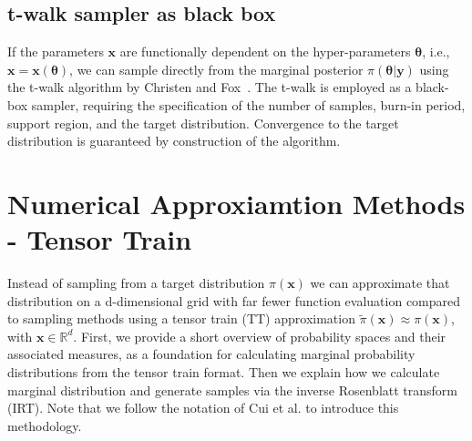 \subsection{t-walk sampler as black box}
If the parameters $\bm{x}$ are functionally dependent on the hyper-parameters $\bm{\theta}$, i.e., $\bm{x} = \bm{x}(\bm{\theta})$, we can sample directly from the marginal posterior $\pi(\bm{\theta} | \bm{y})$ using the t-walk algorithm by Christen and Fox~\cite{christen2010general}. 
The t-walk is employed as a black-box sampler, requiring the specification of the number of samples, burn-in period, support region, and the target distribution. 
Convergence to the target distribution is guaranteed by construction of the algorithm.

\section{Numerical Approxiamtion Methods - Tensor Train}
\label{sec:tensortrain}
Instead of sampling from a target distribution $\pi(\bm{x})$ we can approximate that distribution on a d-dimensional grid with far fewer function evaluation compared to sampling methods using a tensor train (TT) approximation $\tilde{\pi}(\bm{x}) \approx \pi(\bm{x})$, with  $\bm{x}\in \mathbb{R}^d$.
First, we provide a short overview of probability spaces and their associated measures, as a foundation for calculating marginal probability distributions from the tensor train format.
Then we explain how we calculate marginal distribution and generate samples via the inverse Rosenblatt transform (IRT).
Note that we follow the notation of Cui et al. \cite{cui2022deep} to introduce this methodology.

